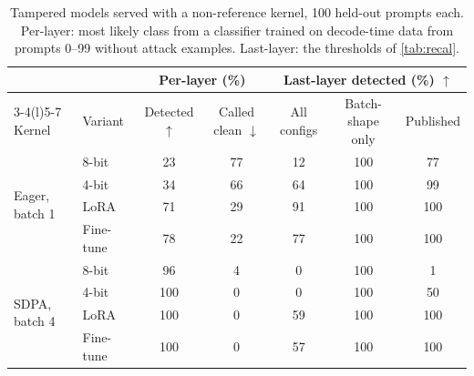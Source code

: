 \documentclass[11pt]{article}
\newcommand{\best}[1]{\cellcolor{blue!8}#1}
\newcommand{\up}{$\uparrow$}
\newcommand{\down}{$\downarrow$}
\begin{document}
\begin{table}[!htb]
\centering
\small
\caption{Tampered models served with a non-reference kernel, 100 held-out prompts each. Per-layer: most likely class from a classifier trained on decode-time data from prompts 0--99 without attack examples. Last-layer: the thresholds of \cref{tab:recal}.}
\label{tab:attack}
\begin{tabular}{@{}llccccc@{}}
\toprule
 & & \multicolumn{2}{c}{Per-layer (\%)} & \multicolumn{3}{c}{Last-layer detected (\%) \up} \\
\cmidrule(lr){3-4}\cmidrule(l){5-7}
Kernel & Variant & Detected \up & Called clean \down & All configs & Batch-shape only & Published \\
\midrule
\multirow{4}{*}{Eager, batch 1} & 8-bit     & 23 & 77 & 12 & 100 & 77  \\
                                & 4-bit     & 34 & 66 & 64 & 100 & 99  \\
                                & LoRA      & 71 & 29 & 91 & 100 & 100 \\
                                & Fine-tune & 78 & 22 & 77 & 100 & 100 \\
\midrule
\multirow{4}{*}{SDPA, batch 4}  & 8-bit     & \best{96}  & 4 & 0  & 100 & 1   \\
                                & 4-bit     & \best{100} & 0 & 0  & 100 & 50  \\
                                & LoRA      & \best{100} & 0 & 59 & 100 & 100 \\
                                & Fine-tune & \best{100} & 0 & 57 & 100 & 100 \\
\bottomrule
\end{tabular}
\end{table}
\end{document}
